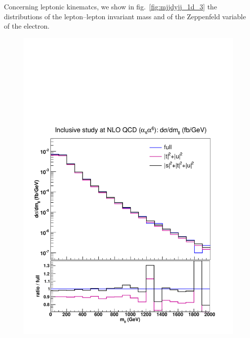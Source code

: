 Concerning leptonic kinematcs, we show in fig.~\ref{fig:mjjdyjj_1d_3} the distributions of the lepton--lepton invariant mass and of the Zeppenfeld variable of the electron.
\begin{figure}[hbt]
\centering
{\includegraphics[scale=0.35]{figures/scanfigures/mll_nlo.pdf}}

\end{figure}
